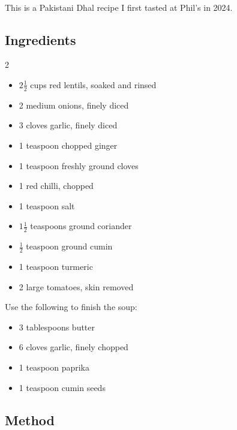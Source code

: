 \documentclass[11pt,a4paper]{article}
\begin{document}
\paragraph*{}
This is a Pakistani Dhal recipe I first tasted at Phil's in 2024.


\subsection*{Ingredients}

\begin{multicols}{2}

\begin{itemize}
  \item $ 2 \frac{1}{2} $ cups red lentils, soaked and rinsed
  \item 2 medium onions, finely diced
  \item 3 cloves garlic, finely diced
  \item 1 teaspoon chopped ginger
  \item 1 teaspoon freshly ground cloves
  \item 1 red chilli, chopped
  \item 1 teaspoon salt
  \item $ 1 \frac{1}{2} $ teaspoons ground coriander
  \item $ \frac{1}{2} $ teaspoon ground cumin
  \item 1 teaspoon turmeric
  \item 2 large tomatoes, skin removed
\end{itemize}

\columnbreak

Use the following to finish the soup:

\begin{itemize}
  \item 3 tablespoons butter
  \item 6 cloves garlic, finely chopped
  \item 1 teaspoon paprika
  \item 1 teaspoon cumin seeds
\end{itemize}

\end{multicols}

\medskip

\subsection*{Method}
\end{document}
